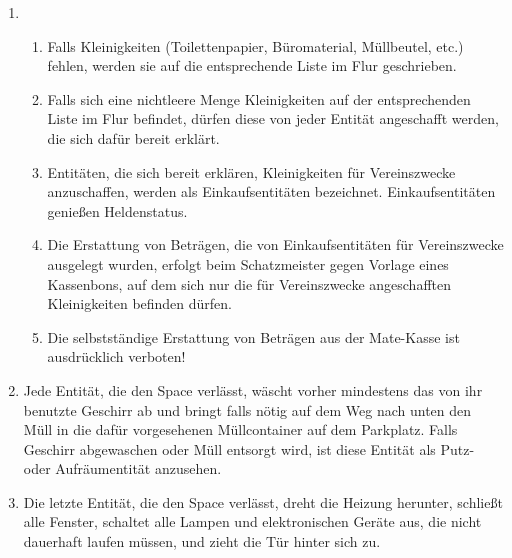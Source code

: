 \documentclass[12pt,a4paper]{scrartcl}
\begin{document}
\begin{enumerate}
  \item\begin{enumerate}
    \item Falls Kleinigkeiten (Toilettenpapier, Büromaterial, Müllbeutel, etc.)
      fehlen, werden sie auf die entsprechende Liste im Flur geschrieben.
    \item Falls sich eine nichtleere Menge Kleinigkeiten auf der entsprechenden
      Liste im Flur befindet, dürfen diese von jeder Entität angeschafft werden,
      die sich dafür bereit erklärt.
    \item Entitäten, die sich bereit erklären, Kleinigkeiten für Vereinszwecke
      anzuschaffen, werden als Einkaufsentitäten bezeichnet. Einkaufsentitäten
      genießen Heldenstatus.
    \item Die Erstattung von Beträgen, die von Einkaufsentitäten für
      Vereinszwecke ausgelegt wurden, erfolgt beim Schatzmeister gegen Vorlage
      eines Kassenbons, auf dem sich nur die für Vereinszwecke angeschafften
      Kleinigkeiten befinden dürfen.
    \item Die selbstständige Erstattung von Beträgen aus der Mate-Kasse ist
      ausdrücklich verboten!
  \end{enumerate}

  \item Jede Entität, die den Space verlässt, wäscht vorher mindestens das von
    ihr benutzte Geschirr ab und bringt falls nötig auf dem Weg nach unten den
    Müll in die dafür vorgesehenen Müllcontainer auf dem Parkplatz. Falls
    Geschirr abgewaschen oder Müll entsorgt wird, ist diese Entität als Putz-
    oder Aufräumentität anzusehen.

  \item Die letzte Entität, die den Space verlässt, dreht die Heizung herunter,
    schließt alle Fenster, schaltet alle Lampen und elektronischen Geräte aus,
    die nicht dauerhaft laufen müssen, und zieht die Tür hinter sich zu.
\end{enumerate}
\end{document}
